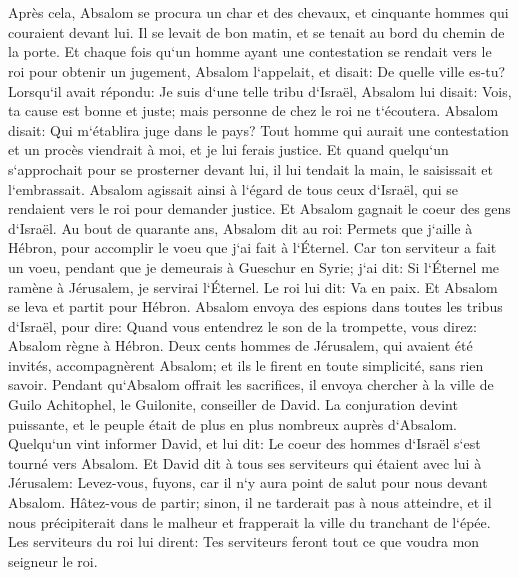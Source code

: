 \chapter{}

\verse Après cela, Absalom se procura un char et des chevaux, et cinquante hommes qui couraient devant lui. 
\verse Il se levait de bon matin, et se tenait au bord du chemin de la porte. Et chaque fois qu`un homme ayant une contestation se rendait vers le roi pour obtenir un jugement, Absalom l`appelait, et disait: De quelle ville es-tu? Lorsqu`il avait répondu: Je suis d`une telle tribu d`Israël, 
\verse Absalom lui disait: Vois, ta cause est bonne et juste; mais personne de chez le roi ne t`écoutera. 
\verse Absalom disait: Qui m`établira juge dans le pays? Tout homme qui aurait une contestation et un procès viendrait à moi, et je lui ferais justice. 
\verse Et quand quelqu`un s`approchait pour se prosterner devant lui, il lui tendait la main, le saisissait et l`embrassait. 
\verse Absalom agissait ainsi à l`égard de tous ceux d`Israël, qui se rendaient vers le roi pour demander justice. Et Absalom gagnait le coeur des gens d`Israël. 
\verse Au bout de quarante ans, Absalom dit au roi: Permets que j`aille à Hébron, pour accomplir le voeu que j`ai fait à l`Éternel. 
\verse Car ton serviteur a fait un voeu, pendant que je demeurais à Gueschur en Syrie; j`ai dit: Si l`Éternel me ramène à Jérusalem, je servirai l`Éternel. 
\verse Le roi lui dit: Va en paix. Et Absalom se leva et partit pour Hébron. 
\verse Absalom envoya des espions dans toutes les tribus d`Israël, pour dire: Quand vous entendrez le son de la trompette, vous direz: Absalom règne à Hébron. 
\verse Deux cents hommes de Jérusalem, qui avaient été invités, accompagnèrent Absalom; et ils le firent en toute simplicité, sans rien savoir. 
\verse Pendant qu`Absalom offrait les sacrifices, il envoya chercher à la ville de Guilo Achitophel, le Guilonite, conseiller de David. La conjuration devint puissante, et le peuple était de plus en plus nombreux auprès d`Absalom. 
\verse Quelqu`un vint informer David, et lui dit: Le coeur des hommes d`Israël s`est tourné vers Absalom. 
\verse Et David dit à tous ses serviteurs qui étaient avec lui à Jérusalem: Levez-vous, fuyons, car il n`y aura point de salut pour nous devant Absalom. Hâtez-vous de partir; sinon, il ne tarderait pas à nous atteindre, et il nous précipiterait dans le malheur et frapperait la ville du tranchant de l`épée. 
\verse Les serviteurs du roi lui dirent: Tes serviteurs feront tout ce que voudra mon seigneur le roi. 
